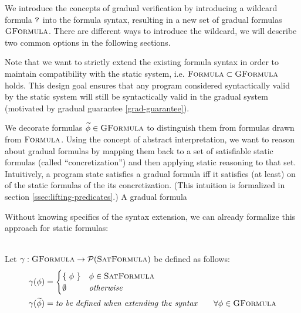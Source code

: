 
We introduce the concepts of gradual verification by introducing a wildcard formula $\texttt{?}$ into the formula syntax, resulting in a new set of gradual formulas $\textsc{GFormula}$.
There are different ways to introduce the wildcard, we will describe two common options in the following sections.

Note that we want to strictly extend the existing formula syntax in order to maintain compatibility with the static system, i.e. $\textsc{Formula} \subset \textsc{GFormula}$ holds.
This design goal ensures that any program considered syntactically valid by the static system will still be syntactically valid in the gradual system (motivated by gradual guarantee \ref{grad-guarantee}).

We decorate formulas $\widetilde{\phi} \in \textsc{GFormula}$ to distinguish them from formulas drawn from $\textsc{Formula}$.
Using the concept of abstract interpretation, we want to reason about gradual formulas by mapping them back to a set of satisfiable static formulas (called “concretization”) and then applying static reasoning to that set.
Intuitively, a program state satisfies a gradual formula iff it satisfies (at least) on of the static formulas of the its concretization.
(This intuition is formalized in section \ref{ssec:lifting-predicates}.)
A gradual formula


Without knowing specifics of the syntax extension, we can already formalize this approach for static formulas:
\begin{definition}[Concretization]~\\
    Let $\gamma : \textsc{GFormula} \rightarrow \mathcal{P}(\textsc{SatFormula})$ be defined as follows:
    \begin{align*}
    &\gamma(\phi) = 
        \begin{cases}
        \{~ \phi ~\}  & \phi \in \textsc{SatFormula}\\
        \emptyset     & \textit{otherwise}
        \end{cases}\\
    &\gamma(\widetilde{\phi}) = \textit{to be defined when extending the syntax}     \quad\quad \forall \phi \in \textsc{GFormula}\\
    \end{align*}
\end{definition}

